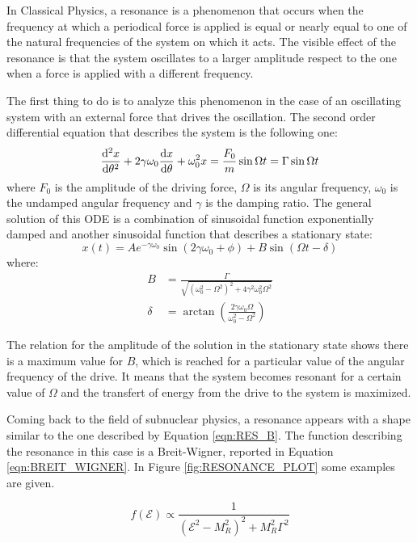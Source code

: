 In Classical Physics, a resonance is a phenomenon that occurs when the frequency at which a periodical force is applied is equal or nearly equal to one of the natural frequencies of the system on which it acts. The visible effect of the resonance is that the system oscillates to a larger amplitude respect to the one when a force is applied with a different frequency.

The first thing to do is to analyze this phenomenon in the case of an oscillating system with an external force that drives the oscillation. The second order differential equation that describes the system is the following one:
\begin{equation}
	\displaystyle \frac{\mathrm{d}^{2} x}{\mathrm{d} {\theta}^{2}} + 2 \gamma \omega_{0} \displaystyle \frac{\mathrm{d} x}{\mathrm{d} \theta} + \omega_{0}^2 x = \frac{F_0}{m} \sin{\Omega t} = \Gamma \sin{\Omega t}
\end{equation}
where $F_{0}$ is the amplitude of the driving force, $\Omega$ is its angular frequency, $\omega_{0}$ is the undamped angular frequency and $\gamma$ is the damping ratio. The general solution of this ODE is a combination of sinusoidal function exponentially damped and another sinusoidal function that describes a stationary state:
\begin{equation}
	x(t) = A e^{-\gamma \omega_{0}} \sin{(2\gamma \omega_{0} + \phi)} + B \sin{(\Omega t - \delta)}
\end{equation}
where:
\begin{align}
	B &= \frac{\Gamma}{\sqrt{(\omega_{0}^2 - \Omega^2)^2 + 4 \gamma^2 \omega_{0}^2 \Omega^2}}	\label{eqn:RES_B}	\\
	\delta &= \arctan{\left( \frac{2 \gamma \omega_{0} \Omega}{\omega_{0}^2 - \Omega^2} \right)}
\end{align}

The relation for the amplitude of the solution in the stationary state shows there is a maximum value for $B$, which is reached for a particular value of the angular frequency of the drive. It means that the system becomes resonant for a certain value of $\Omega$ and the transfert of energy from the drive to the system is maximized. 

Coming back to the field of subnuclear physics, a resonance appears with a shape similar to the one described by Equation \ref{eqn:RES_B}. The function describing the resonance in this case is a Breit-Wigner, reported in Equation \ref{eqn:BREIT_WIGNER}. In Figure \ref{fig:RESONANCE_PLOT} some examples are given.

\begin{equation}
	f(\mathcal{E}) \propto \frac{1}{(\mathcal{E}^2-M_{R}^2)^2 + M_{R}^2 \Gamma^2} \label{eqn:BREIT_WIGNER}
\end{equation}


